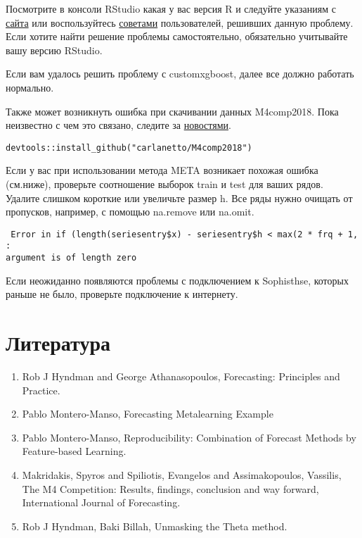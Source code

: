 \documentclass[a4paper,12pt]{article}
\theoremstyle{plain} %
\theoremstyle{definition} %
\theoremstyle{remark} %
\begin{document}
Посмотрите в консоли RStudio какая у вас версия R и следуйте указаниям с
\href{http://www.thecoatlessprofessor.com/programming/r-compiler-tools-for-rcpp-on-macos-before-r-3.6.0/}{сайта}
или воспользуйтесь \href{https://github.com/pmontman/customxgboost/issues/1}{советами} пользователей, решивших данную проблему.
Если хотите найти решение проблемы самостоятельно, обязательно учитывайте вашу версию RStudio.

Если вам удалось решить проблему с customxgboost, далее все должно работать нормально.

Также может возникнуть ошибка при скачивании данных M4comp2018.
Пока неизвестно с чем это связано, следите за \href{https://github.com/carlanetto/M4comp2018/issues/1}{новостями}.

\begin{verbatim}
devtools::install_github("carlanetto/M4comp2018")
\end{verbatim}

Если у вас при использовании метода META возникает похожая ошибка (см.ниже), проверьте соотношение выборок train и test для ваших рядов. Удалите слишком короткие или увеличьте размер h. Все ряды нужно очищать от пропусков, например, с помощью na.remove или na.omit.

 \begin{verbatim}
 Error in if (length(seriesentry$x) - seriesentry$h < max(2 * frq + 1,  :
argument is of length zero
 \end{verbatim}

Если неожиданно появляются проблемы с подключением к Sophisthse, которых раньше не было, проверьте подключение к интернету.

\newpage

\section{Литература}
\begin{enumerate}
  \item Rob J Hyndman and George Athanasopoulos, Forecasting: Principles and Practice.
  \item Pablo Montero-Manso, Forecasting Metalearning Example
  \item Pablo Montero-Manso, Reproducibility: Combination of Forecast Methods by Feature-based Learning.
  \item Makridakis, Spyros and Spiliotis, Evangelos and Assimakopoulos, Vassilis, The M4 Competition: Results, findings, conclusion and way forward, International Journal of Forecasting.
  \item Rob J Hyndman, Baki Billah, Unmasking the Theta method.

\end{enumerate}
\end{document}
